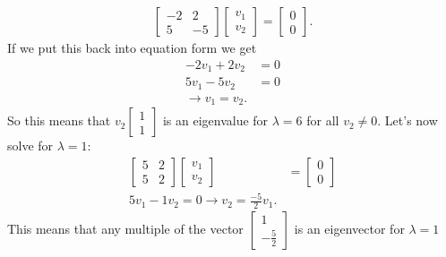 \begin{eg}
\begin{align*}
    \begin{bmatrix} -2&2\\5&-5 \end{bmatrix} \begin{bmatrix} v_1\\v_2 \end{bmatrix} =\begin{bmatrix} 0\\0 \end{bmatrix} 
  .\end{align*}
  If we put this back into equation form we get 
  \begin{align*}
    -2v_1+2v_2&=0\\
    5v_1-5v_2&=0\\
    \to v_1=v_2
  .\end{align*}
  So this means that $v_2\begin{bmatrix} 1\\1 \end{bmatrix} $ is an eigenvalue for $\lambda=6$ for all $v_2\neq 0$. Let's now solve for $\lambda=1:$
  \begin{align*}
    \begin{bmatrix} 5&2\\5&2 \end{bmatrix} \begin{bmatrix} v_1\\v_2 \end{bmatrix} &=\begin{bmatrix} 0\\0 \end{bmatrix} \\
    5v_1-1v_2=0\to v_2=\frac{-5}{2}v_1
  .\end{align*}
  This means that any multiple of the vector $\begin{bmatrix} 1\\-\frac{5}{2} \end{bmatrix}$ is an eigenvector for $\lambda=1$
\end{eg}
